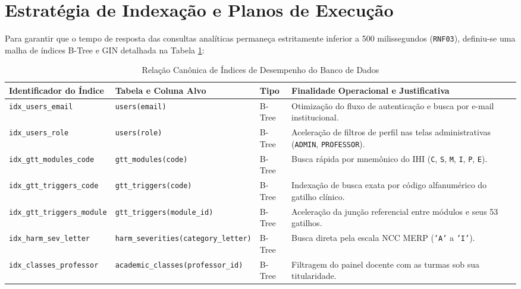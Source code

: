 \section{Estratégia de Indexação e Planos de Execução}
\label{sec_estrategia_indexacao}

Para garantir que o tempo de resposta das consultas analíticas permaneça estritamente inferior a 500 milissegundos (\texttt{RNF03}), definiu-se uma malha de índices B-Tree e GIN detalhada na Tabela \ref{tab_indices_banco}:

\begin{table}[!ht]
\centering
\caption{Relação Canônica de Índices de Desempenho do Banco de Dados}
\label{tab_indices_banco}
\footnotesize
\begin{tabularx}{\textwidth}{p{4.5cm} p{3.9cm} p{1.1cm} X}
\toprule
\textbf{Identificador do Índice} & \textbf{Tabela e Coluna Alvo} & \textbf{Tipo} & \textbf{Finalidade Operacional e Justificativa} \\
\midrule
\texttt{idx\_users\_email} & \texttt{users(email)} & B-Tree & Otimização do fluxo de autenticação e busca por e-mail institucional. \\
\texttt{idx\_users\_role} & \texttt{users(role)} & B-Tree & Aceleração de filtros de perfil nas telas administrativas (\texttt{ADMIN}, \texttt{PROFESSOR}). \\
\texttt{idx\_gtt\_modules\_code} & \texttt{gtt\_modules(code)} & B-Tree & Busca rápida por mnemônico do IHI (\texttt{C}, \texttt{S}, \texttt{M}, \texttt{I}, \texttt{P}, \texttt{E}). \\
\texttt{idx\_gtt\_triggers\_code} & \texttt{gtt\_triggers(code)} & B-Tree & Indexação de busca exata por código alfanumérico do gatilho clínico. \\
\texttt{idx\_gtt\_triggers\_module} & \texttt{gtt\_triggers}\newline\texttt{(module\_id)} & B-Tree & Aceleração da junção referencial entre módulos e seus 53 gatilhos. \\
\texttt{idx\_harm\_sev\_letter} & \texttt{harm\_severities}\newline\texttt{(category\_letter)} & B-Tree & Busca direta pela escala NCC MERP (\texttt{'A'} a \texttt{'I'}). \\
\texttt{idx\_classes\_professor} & \texttt{academic\_classes}\newline\texttt{(professor\_id)} & B-Tree & Filtragem do painel docente com as turmas sob sua titularidade. \\

\end{tabularx}
\end{table}
